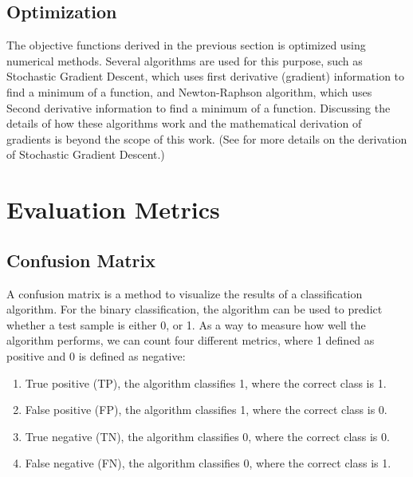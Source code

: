\subsection{Optimization}

The objective functions derived in the previous section is optimized using numerical methods. Several algorithms are used for this purpose, such as Stochastic Gradient Descent, which uses first derivative (gradient) information to find a minimum of a function, and Newton-Raphson algorithm, which uses Second derivative information to find a minimum of a function. Discussing the details of how these algorithms work and the mathematical derivation of gradients is beyond the scope of this work. (See \citep{jurafsky2014speech} for more details on the derivation of Stochastic Gradient Descent.) 

\section{Evaluation Metrics}
\subsection{Confusion Matrix}

A confusion matrix is a method to visualize the results of a classification algorithm. For the binary classification, the algorithm can be used to predict whether a test sample is either 0, or 1. As a way to measure how well the algorithm performs, we can count four different metrics, where 1 defined as positive and 0 is defined as negative:

\begin{enumerate}

\item True positive (TP), the algorithm classifies 1, where the correct class is 1.
\item False positive (FP), the algorithm classifies 1, where the correct class is 0.
\item True negative (TN), the algorithm classifies 0, where the correct class is 0.
\item False negative (FN), the algorithm classifies 0, where the correct class is 1.

\end{enumerate}

